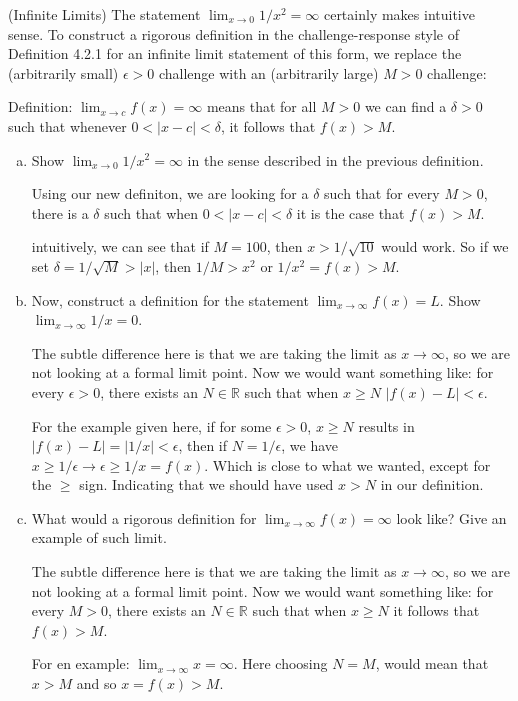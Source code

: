 (Infinite Limits) The statement $\lim_{x\rightarrow 0} 1/x^2 = \infty$ certainly makes intuitive sense.
To construct a rigorous definition in the challenge-response style of Definition 4.2.1 for an infinite limit statement
of this form, we replace the (arbitrarily small) $\epsilon > 0$ challenge with an (arbitrarily large) $M>0$ challenge:

Definition: $\lim_{x\rightarrow c} f(x) = \infty$ means that for all $M>0$ we can find a $\delta >0$
such that whenever $0 < |x-c| < \delta$, it follows that $f(x) > M$.

\begin{enumerate}[(a)]
\item Show $\lim_{x\rightarrow 0} 1/x^2 = \infty$ in the sense described in the previous definition.

Using our new definiton, we are looking for a $\delta$ such that for every $M>0$, there is a $\delta$ such that when
$0 < |x-c| < \delta$ it is the case that $f(x) > M$.

intuitively, we can see that if $M=100$, then $x> 1/\sqrt{10}$ would work.
So if we set $\delta = 1/\sqrt{M} > |x|$, then $1/M > x^2$ or $1/x^2 = f(x)> M$.



\item Now, construct a definition for the statement $\lim_{x\rightarrow \infty} f(x) = L$. Show $\lim_{x\rightarrow \infty} 1/x =0$.

The subtle difference here is that we are taking the limit as $x\rightarrow\infty$, so we are not looking at a formal limit point.
Now we would want something like: for every $\epsilon>0$, there exists an $N\in\mathbb{R}$ such that when $x \geq N$
$|f(x) - L| < \epsilon$.


For the example given here, if for some $\epsilon > 0$, $x \geq N$ results in $|f(x)-L| = |1/x|<\epsilon$,
then if $N = 1/\epsilon$, we have $x \geq 1/\epsilon \rightarrow \epsilon \geq 1/x = f(x)$.
Which is close to what we wanted, except for the $\geq$ sign.
Indicating that we should have used $x>N$ in our definition.



\item What would a rigorous definition for $\lim_{x\rightarrow \infty} f(x) = \infty$ look like?
Give an example of such limit.


The subtle difference here is that we are taking the limit as $x\rightarrow\infty$, so we are not looking at a formal limit point.
Now we would want something like: for every $M>0$, there exists an $N\in\mathbb{R}$ such that when $x \geq N$
it follows that $f(x)>M$.

For en example: $\lim_{x\rightarrow\infty} x = \infty$.
Here choosing $N=M$, would mean that $x > M$ and so $x = f(x) > M$.

\end{enumerate}




